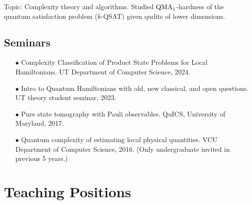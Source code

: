 \documentclass[11pt,letterpaper,serif]{moderncv}
\begin{document}
{}


{
	\begin{adjustwidth}{.25in}{}
		Topic: Complexity theory and algorithms. Studied $\textup{QMA}_{1}$-hardness of the quantum satisfaction problem ($k$-QSAT) given qudits of lower dimensions.
	\end{adjustwidth}
}

\subsection{Seminars}

\begin{itemize}
	\item[$\bullet$] Complexity Classification of Product State Problems for Local Hamiltonians.\quad
	UT Department of Computer Science, 2024.

	\item[$\bullet$] Intro to Quantum Hamiltonians with old, new classical, and open questions.\quad
	UT theory student seminar, 2023.

	\item[$\bullet$] Pure state tomography with Pauli observables.\quad
	QuICS, University of Maryland, 2017.

	\item[$\bullet$] Quantum complexity of estimating local physical quantities.\quad
	VCU Department of Computer Science, 2016.\quad
	(Only undergraduate invited in previous 5 years.)
\end{itemize}


\section{Teaching Positions}
\end{document}
